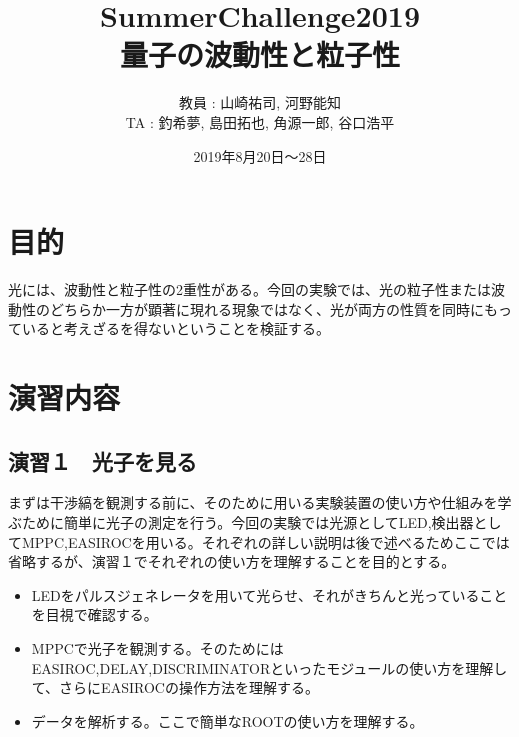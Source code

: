 \documentclass[10pt,a4j]{jarticle}
\begin{document}
\begin{titlepage}
\title{SummerChallenge2019 \\ \Huge 量子の波動性と粒子性}

\author{教員 : 山崎祐司, 河野能知 \\TA : 釣希夢, 島田拓也, 角源一郎, 谷口浩平}
\date{2019年8月20日〜28日}
\maketitle
\end{titlepage}

\tableofcontents
\clearpage

\section{目的}
光には、波動性と粒子性の2重性がある。今回の実験では、光の粒子性または波動性のどちらか一方が顕著に現れる現象ではなく、光が両方の性質を同時にもっていると考えざるを得ないということを検証する。

\section{演習内容}

\subsection{演習１　光子を見る}
まずは干渉縞を観測する前に、そのために用いる実験装置の使い方や仕組みを学ぶために簡単に光子の測定を行う。今回の実験では光源としてLED,検出器としてMPPC,EASIROCを用いる。それぞれの詳しい説明は後で述べるためここでは省略するが、演習１でそれぞれの使い方を理解することを目的とする。
\begin{itemize}
\item LEDをパルスジェネレータを用いて光らせ、それがきちんと光っていることを目視で確認する。
\item MPPCで光子を観測する。そのためにはEASIROC,DELAY,DISCRIMINATORといったモジュールの使い方を理解して、さらにEASIROCの操作方法を理解する。
\item データを解析する。ここで簡単なROOTの使い方を理解する。
\end{itemize}
\end{document}
